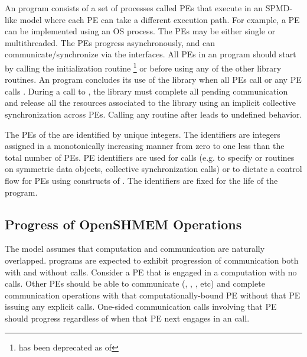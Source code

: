 An \openshmem program consists of a set of \openshmem processes called \acp{PE}
that execute in an \ac{SPMD}-like model where each \ac{PE} can take a different
execution path. For example, a \ac{PE} can be implemented using an OS
process. The \acp{PE} may be either single or multithreaded.
The \acp{PE} progress asynchronously, and can communicate/synchronize
via the \openshmem interfaces.  All \acp{PE} in an \openshmem program should
start by calling the initialization routine %
\footnote{ has been deprecated as of \openshmem[1.2]}
or  before using any of the other \openshmem library routines.
An \openshmem program concludes its use of the \openshmem library when all \acp{PE} call
 or any \ac{PE} calls .
During a call to , the \openshmem library must
complete all pending communication and release all the resources associated to
the library using an implicit collective synchronization across \acp{PE}.
Calling any \openshmem routine after  leads to undefined
behavior.

The \acp{PE} of the \openshmem {} are identified by unique integers.  The
identifiers are integers assigned in a monotonically increasing manner from zero
to one less than the total number of \acp{PE}. \ac{PE} identifiers are used for
\openshmem calls (e.g. to specify  or  routines on symmetric
data objects, collective synchronization calls) or to dictate a control flow for
\acp{PE} using constructs of \Cstd. The identifiers are fixed for
the life of the \openshmem program.

\subsection{Progress of OpenSHMEM Operations}\label{subsec:progress}

The \openshmem model assumes that computation and communication are naturally
overlapped. \openshmem programs are expected to exhibit progression of
communication both with and without \openshmem calls. Consider a \ac{PE} that is
engaged in a computation with no \openshmem calls. Other \acp{PE} should be able
to communicate (, , , etc) and
complete communication operations with that computationally-bound \ac{PE}
without that \ac{PE} issuing any explicit \openshmem calls. One-sided \openshmem
communication calls involving that \ac{PE} should progress regardless of when
that \ac{PE} next engages in an \openshmem call.

